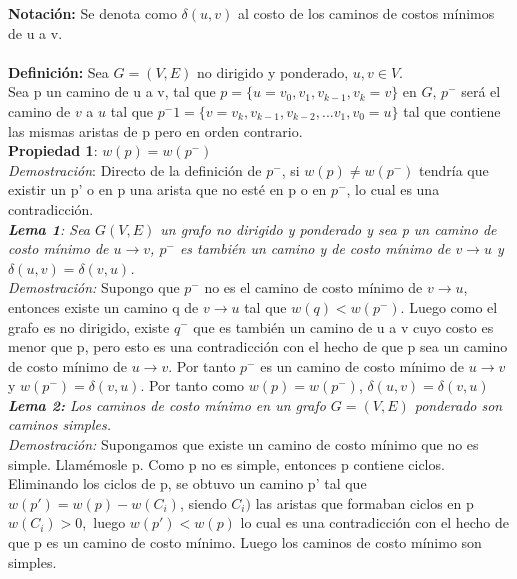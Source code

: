 \documentclass[12pt]{article}
\begin{document}
\textbf{ Notaci\'on:} Se denota como $\delta (u, v)$ al costo de los caminos de costos m\'inimos de u a v.\\
\\


\textbf{Definici\'on:} Sea $G = (V, E)$ no dirigido y ponderado, $u, v \in V$.\\
              Sea p un camino de u a v, tal que $p = \{u= v_0, v_1, v_{k-1}, v_k=v\}$ en $G$, $p^-$ ser\'a el camino de $v$ a $u$ tal que
 $p^-1 =\{v=v_k,v_{k-1}, v_{k-2},...v_1,v_0 = u\}$ tal que contiene las mismas aristas de p pero en orden contrario.\\

\textbf{Propiedad 1}: $w(p) = w(p^-)$\\

\textit{ Demostraci\'on}: Directo de la definici\'on de $p^-$, si $w(p) \neq w(p^-)$ tendr\'ia que existir un p' o  en p una arista que no est\'e en p o en 
$p^-$, lo  cual es una contradicci\'on.\\

\textit{ \textbf{Lema 1}: Sea $G(V,E)$ un grafo no  dirigido y ponderado y sea p un camino de costo m\'inimo de $u \rightarrow v$, $p^-$ es tambi\'en un  camino  y 
de costo m\'inimo de $v \rightarrow u$ y $\delta (u,v) = \delta (v,u)$.}\\

\textit{Demostraci\'on:} Supongo que $p^-$ no es el camino de costo m\'inimo de $v \rightarrow u$, entonces existe un camino q de $v \rightarrow u$ tal que
$w(q) < w(p^-)$.  Luego como el grafo es no dirigido, existe $q^-$ que  es tambi\'en un camino de u a v cuyo costo es menor que p, pero esto es
una contradicci\'on con el hecho de que p sea un camino de costo m\'inimo de $u \rightarrow v$. Por tanto $p^-$ es un camino de costo m\'inimo de
 $u \rightarrow v$ y $w(p^-) = \delta(v, u)$. Por tanto como $w(p) = w(p^-)$, $\delta (u, v) = \delta (v, u)$\\

\textit{\textbf{Lema 2:} Los caminos de costo m\'inimo  en un grafo $G =(V, E)$ ponderado son caminos simples.}\\

\textit{Demostraci\'on:} Supongamos que existe un camino de costo m\'inimo que no es simple.  Llam\'emosle p. Como p no es simple, entonces p contiene ciclos.\\
Eliminando los ciclos de p, se obtuvo un camino p' tal que\\ 

$w(p') = w(p)- w(C_i)$, siendo $C_i)$ las aristas que formaban ciclos en p $w(C_i) > 0$,\
luego $w(p') < w(p)$ lo cual es una contradicci\'on  con el hecho de que p es un camino de costo m\'inimo.  Luego los caminos de costo m\'inimo son simples.\\
\end{document}
